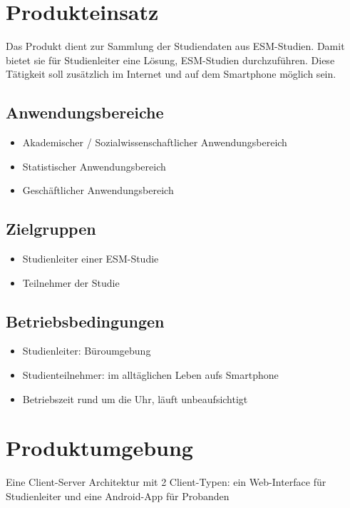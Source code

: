 \documentclass[a4paper]{scrreprt}
\begin{document}
    \chapter{Produkteinsatz}
        Das Produkt dient zur Sammlung der Studiendaten aus ESM-Studien. Damit bietet sie für \gls{Studienleiter} eine Lösung, ESM-Studien durchzuführen. Diese Tätigkeit soll zusätzlich im Internet und auf dem Smartphone möglich sein.

        \section{Anwendungsbereiche}
            \begin{itemize}
                \item Akademischer / Sozialwissenschaftlicher Anwendungsbereich
                \item Statistischer Anwendungsbereich
                \item Geschäftlicher Anwendungsbereich
            \end{itemize}

        \section{Zielgruppen}
            \begin{itemize}
                \item \gls{Studienleiter} einer ESM-Studie
                \item Teilnehmer der Studie
            \end{itemize}

        \section{Betriebsbedingungen}
            \begin{itemize}
                \item \gls{Studienleiter}: Büroumgebung
                \item Studienteilnehmer: im alltäglichen Leben aufs Smartphone
                \item Betriebszeit rund um die Uhr, läuft unbeaufsichtigt
            \end{itemize}

    \chapter{Produktumgebung}
        Eine Client-Server Architektur mit 2 Client-Typen: ein \gls{Web-Interface} für \gls{Studienleiter} und eine \gls{Android-App} für \gls{Proband}en
\end{document}
